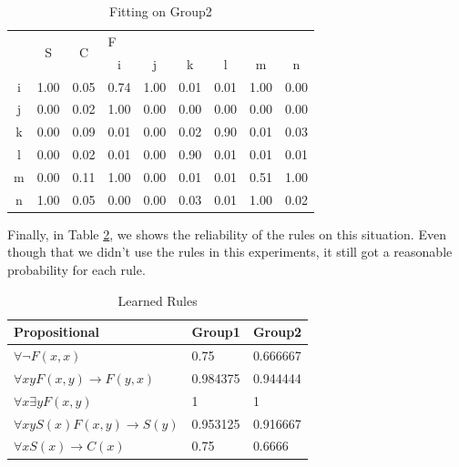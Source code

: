\begin{table}[]
\centering
\begin{tabular}{c|c|c|cccccc}
\toprule
\multirow{2}{*}{} & \multirow{2}{*}{S} & \multirow{2}{*}{C} & \multicolumn{6}{l}{F}                   \\ \cmidrule{4-9}
                  &                    &                    & i    & j    & k    & l    & m    & n    \\ \midrule
i                 & 1.00               & 0.05               & 0.74 & 1.00 & 0.01 & 0.01 & 1.00 & 0.00 \\
j                 & 0.00               & 0.02               & 1.00 & 0.00 & 0.00 & 0.00 & 0.00 & 0.00 \\
k                 & 0.00               & 0.09               & 0.01 & 0.00 & 0.02 & 0.90 & 0.01 & 0.03 \\
l                 & 0.00               & 0.02               & 0.01 & 0.00 & 0.90 & 0.01 & 0.01 & 0.01 \\
m                 & 0.00               & 0.11               & 1.00 & 0.00 & 0.01 & 0.01 & 0.51 & 1.00 \\
n                 & 1.00               & 0.05               & 0.00 & 0.00 & 0.03 & 0.01 & 1.00 & 0.02 \\ \bottomrule
\end{tabular}
\caption{Fitting on Group2}
\label{table:fitting-group-2}
\end{table}

Finally, in Table \ref{table:fitting-learned-rules}, we shows the reliability of the rules on this situation. Even though that we didn't use the rules in this experiments, it still got a reasonable probability for each rule.

\begin{table}[]
\centering
\begin{tabular}{lll}
\toprule
Propositional           & Group1   & Group2   \\ \midrule
$\forall \neg F(x, x)$                & 0.75     & 0.666667 \\
$\forall x y F(x,y)\rightarrow F(y,x) $      & 0.984375 & 0.944444 \\
$\forall x \exists y F(x,y) $                 & 1        & 1        \\
$\forall x y S(x) F(x,y)\rightarrow S(y) $ & 0.953125 & 0.916667 \\
$\forall x S(x)\rightarrow C(x) $            & 0.75     & 0.6666   \\ \bottomrule
\end{tabular}
\caption{Learned Rules}
\label{table:fitting-learned-rules}
\end{table}
